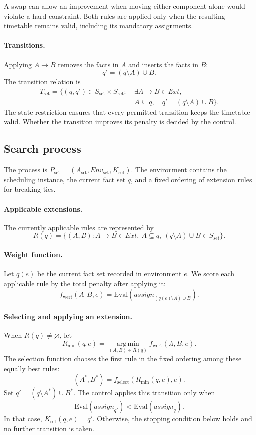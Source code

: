 A swap can allow an improvement when moving either
component alone would violate a hard constraint.
Both rules are applied only when the resulting timetable
remains valid, including its mandatory assignments.

\paragraph{Transitions.}
Applying $A\to B$ removes the facts in $A$ and inserts
the facts in $B$:
\[
q'=(q\setminus A)\cup B.
\]
The transition relation is
\[
\begin{aligned}
T_{\mathrm{set}}=\{(q,q')\in
S_{\mathrm{set}}\times S_{\mathrm{set}}:\ &
\exists A\to B\in\mathit{Ext},\\
&A\subseteq q,\quad
q'=(q\setminus A)\cup B\}.
\end{aligned}
\]
The state restriction ensures that every permitted
transition keeps the timetable valid. Whether the
transition improves its penalty is decided by the control.

\subsection{Search process}
\label{sec:set-process}

The process is
$P_{\mathrm{set}}=(A_{\mathrm{set}},
\mathit{Env}_{\mathrm{set}},K_{\mathrm{set}})$.
The environment contains the scheduling instance, the
current fact set $q$, and a fixed ordering of extension
rules for breaking ties.

\paragraph{Applicable extensions.}
The currently applicable rules are represented by
\[
R(q)=\{(A,B):
 A\to B\in\mathit{Ext},\
 A\subseteq q,\
 (q\setminus A)\cup B\in S_{\mathrm{set}}\}.
\]

\paragraph{Weight function.}
Let $q(e)$ be the current fact set recorded in environment
$e$. We score each applicable rule by the total penalty
after applying it:
\[
f_{\mathrm{wert}}(A,B,e)
=\mathrm{Eval}\!\left(
 \mathit{assign}_{(q(e)\setminus A)\cup B}
 \right).
\]

\paragraph{Selecting and applying an extension.}
When $R(q)\neq\varnothing$, let
\[
R_{\min}(q,e)
=\operatorname*{arg\,min}_{(A,B)\in R(q)}
 f_{\mathrm{wert}}(A,B,e).
\]
The selection function chooses the first rule in the
fixed ordering among these equally best rules:
\[
(A^*,B^*)=f_{\mathrm{select}}(R_{\min}(q,e),e).
\]
Set $q'=(q\setminus A^*)\cup B^*$.
The control applies this transition only when
\[
\mathrm{Eval}(\mathit{assign}_{q'})
<
\mathrm{Eval}(\mathit{assign}_q).
\]
In that case, $K_{\mathrm{set}}(q,e)=q'$.
Otherwise, the stopping condition below holds and no
further transition is taken.

